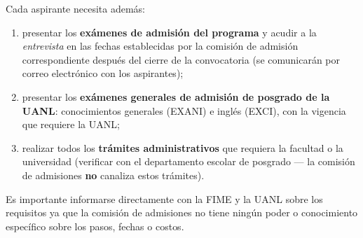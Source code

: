 \documentclass{article}
\begin{document}
\begin{Form}
Cada aspirante necesita además:
\begin{enumerate}
\item presentar los {\bf exámenes de admisión del programa} y acudir a la
  {\em entrevista} en las fechas establecidas por la comisión de admisión
  correspondiente después del cierre de la convocatoria (se
  comunicarán por correo electrónico con los aspirantes);
\item presentar los {\bf exámenes generales de admisión de posgrado de
  la UANL}: conocimientos generales (EXANI) e inglés (EXCI), con la
  vigencia que requiere la UANL;
\item realizar todos los {\bf trámites administrativos} que requiera
  la facultad o la universidad (verificar con el departamento escolar de
  posgrado --- la comisión de admisiones {\bf no} canaliza estos
  trámites).
\end{enumerate}

Es importante informarse directamente con la FIME y la UANL sobre los
requisitos ya que la comisión de admisiones no tiene ningún poder o
conocimiento específico sobre los pasos, fechas o costos.

\end{Form}
\end{document}
